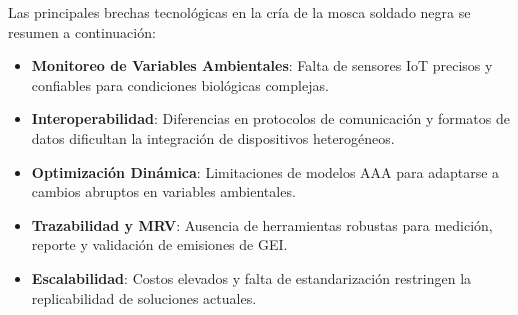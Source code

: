 Las principales brechas tecnológicas en la cría de la mosca soldado negra se resumen a continuación:
\begin{itemize}
    \item \textbf{Monitoreo de Variables Ambientales}: Falta de sensores IoT precisos y confiables para condiciones biológicas complejas.
    \item \textbf{Interoperabilidad}: Diferencias en protocolos de comunicación y formatos de datos dificultan la integración de dispositivos heterogéneos.
    \item \textbf{Optimización Dinámica}: Limitaciones de modelos AAA para adaptarse a cambios abruptos en variables ambientales.
    \item \textbf{Trazabilidad y MRV}: Ausencia de herramientas robustas para medición, reporte y validación de emisiones de GEI.
    \item \textbf{Escalabilidad}: Costos elevados y falta de estandarización restringen la replicabilidad de soluciones actuales.
\end{itemize}
